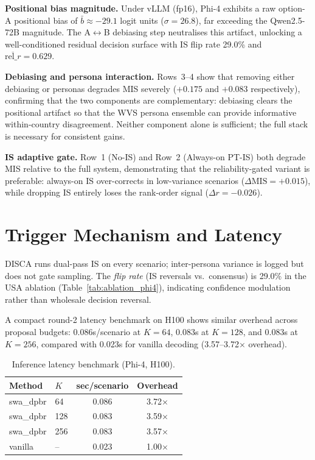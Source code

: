 \documentclass{article}
\begin{document}
\textbf{Positional bias magnitude.}
Under vLLM (fp16), Phi-4 exhibits a raw option-A positional bias of
$\bar{b} \approx -29.1$ logit units ($\sigma = 26.8$), far exceeding the Qwen2.5-72B
magnitude. The A$\leftrightarrow$B debiasing step neutralises this artifact, unlocking
a well-conditioned residual decision surface with IS flip rate 29.0\% and
$\overline{\text{rel}\_r} = 0.629$.

\textbf{Debiasing and persona interaction.}
Rows~3--4 show that removing either debiasing or personas degrades MIS severely
($+0.175$ and $+0.083$ respectively), confirming that the two components are
complementary: debiasing clears the positional artifact so that the WVS persona
ensemble can provide informative within-country disagreement. Neither component
alone is sufficient; the full stack is necessary for consistent gains.

\textbf{IS adaptive gate.}
Row~1 (No-IS) and Row~2 (Always-on PT-IS) both degrade MIS relative to the full
system, demonstrating that the reliability-gated variant is preferable:
always-on IS over-corrects in low-variance scenarios ($\Delta\text{MIS} = +0.015$),
while dropping IS entirely loses the rank-order signal ($\Delta r = -0.026$).

\section{Trigger Mechanism and Latency}
\label{app:trigger}

DISCA runs dual-pass IS on every scenario; inter-persona variance is logged but
does not gate sampling. The \emph{flip rate} (IS reversals vs.\ consensus) is 29.0\%
in the USA ablation (Table~\ref{tab:ablation_phi4}), indicating confidence modulation rather than wholesale
decision reversal.

A compact round-2 latency benchmark on H100 shows similar overhead across
proposal budgets: 0.086s/scenario at $K{=}64$, 0.083s at $K{=}128$, and 0.083s at
$K{=}256$, compared with 0.023s for vanilla decoding (3.57--3.72$\times$
overhead).
\begin{table}[h]\centering\scriptsize
\caption{Inference latency benchmark (Phi-4, H100).}
\label{tab:r2_latency_compact}
\begin{tabular}{llcc}\toprule
Method & $K$ & sec/scenario & Overhead \\\midrule
swa\_dpbr & 64 & 0.086 & 3.72$\times$ \\
swa\_dpbr & 128 & 0.083 & 3.59$\times$ \\
swa\_dpbr & 256 & 0.083 & 3.57$\times$ \\
vanilla & -- & 0.023 & 1.00$\times$ \\
\bottomrule
\end{tabular}
\end{table}
\end{document}
